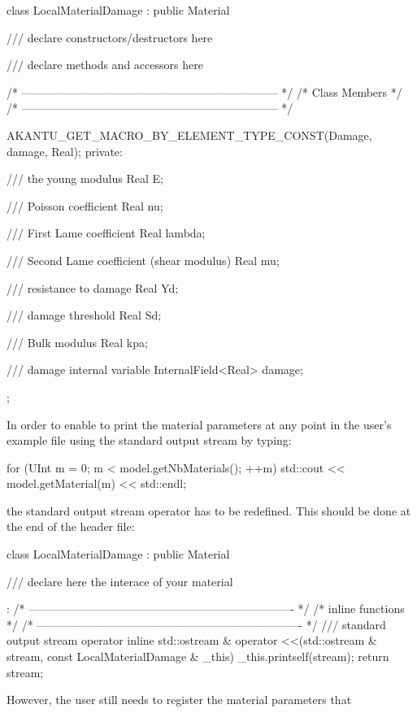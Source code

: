 \begin{cpp}
class LocalMaterialDamage : public Material {

/// declare constructors/destructors here

/// declare methods and accessors here

  /* -------------------------------------------------------------------- */
  /* Class Members                                                        */
  /* -------------------------------------------------------------------- */

  AKANTU_GET_MACRO_BY_ELEMENT_TYPE_CONST(Damage, damage, Real);
private:

  /// the young modulus
  Real E;

  /// Poisson coefficient
  Real nu;

  /// First Lame coefficient
  Real lambda;

  /// Second Lame coefficient (shear modulus)
  Real mu;

  /// resistance to damage
  Real Yd;

  /// damage threshold
  Real Sd;

  /// Bulk modulus
  Real kpa;

  /// damage internal variable
  InternalField<Real> damage;

};
\end{cpp}
In order to enable to print the material parameters at any point in
the user's example file using the standard output stream by typing:
\begin{cpp}
for (UInt m = 0; m  < model.getNbMaterials(); ++m)
  std::cout << model.getMaterial(m) << std::endl;
\end{cpp}
the standard output stream operator has to be redefined. This should be done at the end of the header file:
\begin{cpp}
class LocalMaterialDamage : public Material {

  /// declare here the interace of your material

}:
/* ---------------------------------------------------------------------- */
/* inline functions                                                       */
/* ---------------------------------------------------------------------- */
/// standard output stream operator
inline std::ostream & operator <<(std::ostream & stream, const LocalMaterialDamage & _this)
{
  _this.printself(stream);
  return stream;
}
\end{cpp}
However, the user still needs to register the material parameters that
